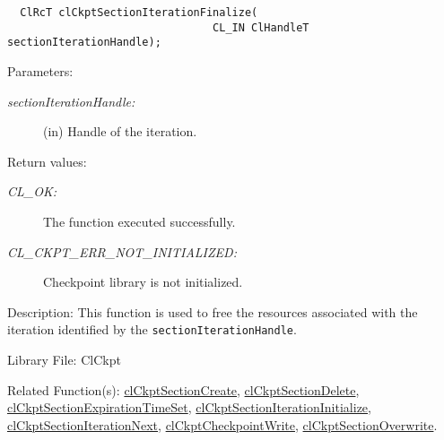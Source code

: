 \begin{flushleft}
\begin{Desc}
\footnotesize\begin{verbatim}  ClRcT clCkptSectionIterationFinalize(
                     			CL_IN ClHandleT sectionIterationHandle);
\end{verbatim}
\normalsize
\end{Desc}
\begin{Desc}
\item[Parameters:]
\begin{description}
\item[{\em section\-Iteration\-Handle:}](in) Handle of the iteration.\end{description}
\end{Desc}
\begin{Desc}
\item[Return values:]
\begin{description}
\item[{\em CL\_\-OK:}]The function executed successfully.
\item[{\em CL\_\-CKPT\_\-ERR\_\-NOT\_\-INITIALIZED:}]Checkpoint library is not initialized. 
\end{description}
\end{Desc}
\begin{Desc}
\item[Description:]This function is used to free the resources associated with the iteration identified by the {\tt{section\-Iteration\-Handle}}.\end{Desc}
\begin{Desc}
\item[Library File:]Cl\-Ckpt\end{Desc}
\begin{Desc}
\item[Related Function(s):]\hyperlink{pageckpt110}{cl\-Ckpt\-Section\-Create}, \hyperlink{pageckpt111}{cl\-Ckpt\-Section\-Delete}, 
\hyperlink{pageckpt112}{cl\-Ckpt\-Section\-Expiration\-Time\-Set}, \hyperlink{pageckpt113}{cl\-Ckpt\-Section\-Iteration\-Initialize}, 
\hyperlink{pageckpt114}{cl\-Ckpt\-Section\-Iteration\-Next}, \hyperlink{pageckpt116}{cl\-Ckpt\-Checkpoint\-Write}, 
\hyperlink{pageckpt117}{cl\-Ckpt\-Section\-Overwrite}. \end{Desc}
\newpage




\end{flushleft}
